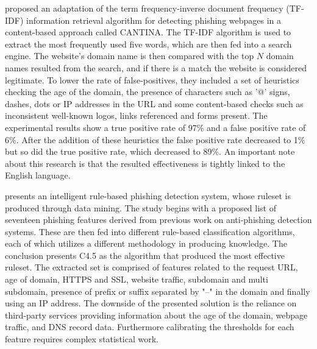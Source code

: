 \cite{CANTINA} proposed an adaptation of the term frequency-inverse document
frequency (TF-IDF) information retrieval algorithm for detecting phishing
webpages in a content-based approach called CANTINA. The TF-IDF algorithm is
used to extract the most frequently used five words, which are then fed into a
search engine. The website's domain name is then compared with the top \(N\)
domain names resulted from the search, and if there is a match the website is
considered legitimate.
To lower the rate of false-positives, they included a set of heuristics checking
the age of the domain, the presence of characters such as '@' signs, dashes,
dots or IP addresses in the URL and some content-based checks such as
inconsistent well-known logos, links referenced and forms present. The
experimental results show a true positive rate of 97\% and a false positive rate
of 6\%. After the addition of these heuristics the false positive rate decreased
to 1\% but so did the true positive rate, which decreased to 89\%. An important
note about this research is that the resulted effectiveness is tightly linked to
the English language.

\cite{RULE_BASED_CLASSIFICATION} presents an intelligent rule-based phishing
detection system, whose ruleset is produced through data mining. The study
begins with a proposed list of seventeen phishing features derived from previous
work on anti-phishing detection systems. These are then fed into different
rule-based classification algorithms, each of which utilizes a different
methodology in producing knowledge. The conclusion presents C4.5 \citep{C4.5} as
the algorithm that produced the most effective ruleset. The extracted set is
comprised of features related to the request URL, age of domain, HTTPS and SSL,
website traffic, subdomain and multi subdomain, presence of prefix or suffix
separated by "--" in the domain and finally using an IP address. The downside of
the presented solution is the reliance on third-party services providing
information about the age of the domain, webpage traffic, and DNS record data.
Furthermore calibrating the thresholds for each feature requires complex
statistical work.

